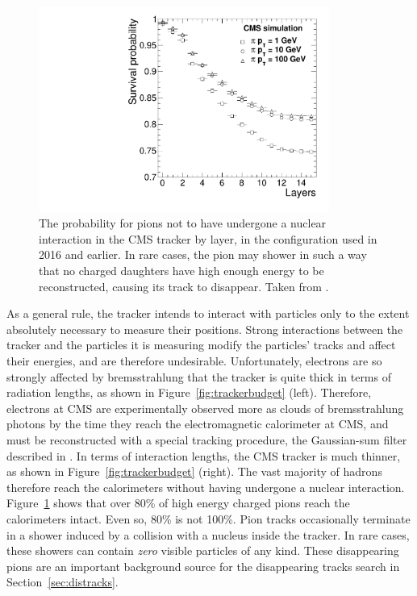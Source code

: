   \begin{figure}[h!]
    \centering
    \includegraphics[width=0.85\textwidth]{figures/PionSurvivalProbability.pdf}
    \caption[Pion survival in the tracker.]{
      The probability for pions not to have undergone a nuclear interaction in the CMS tracker by layer, in the configuration used in 2016 and earlier. 
      In rare cases, the pion may shower in such a way that no charged daughters have high enough energy to be reconstructed, causing its track to disappear.
      Taken from \cite{cmstracking}.}
    \label{fig:pionsurvival}
  \end{figure}  

  As a general rule, the tracker intends to interact with particles only to the extent absolutely necessary to measure their positions.
  Strong interactions between the tracker and the particles it is measuring modify the particles' tracks and affect their energies, and are therefore undesirable.
  Unfortunately, electrons are so strongly affected by bremsstrahlung that the tracker is quite thick in terms of radiation lengths, as shown in Figure~\ref{fig:trackerbudget} (left).
  Therefore, electrons at CMS are experimentally observed more as clouds of bremsstrahlung photons by the time they reach the electromagnetic calorimeter at CMS, and must be reconstructed with a special tracking procedure, the Gaussian-sum filter described in \cite{gsftracking}.
  In terms of interaction lengths, the CMS tracker is much thinner, as shown in Figure~\ref{fig:trackerbudget} (right).
  The vast majority of hadrons therefore reach the calorimeters without having undergone a nuclear interaction.
  Figure~\ref{fig:pionsurvival} shows that over 80\% of high energy charged pions reach the calorimeters intact.
  Even so, 80\% is not 100\%.
  Pion tracks occasionally terminate in a shower induced by a collision with a nucleus inside the tracker.
  In rare cases, these showers can contain {\it zero} visible particles of any kind.
  These disappearing pions are an important background source for the disappearing tracks search in Section~\ref{sec:distracks}.

